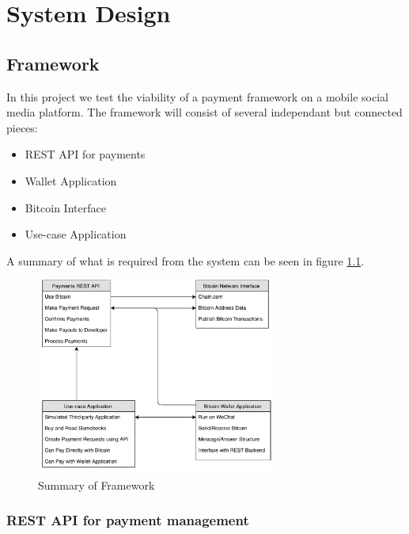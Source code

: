 \chapter{System Design}
\label{chp:System Design}


\section{Framework}

In this project we test the viability of a payment framework on a mobile social media platform. The framework will consist of several independant but connected pieces:

\begin{itemize}
	\item REST API for payments
	\item Wallet Application
	\item Bitcoin Interface
	\item Use-case Application
\end{itemize}

A summary of what is required from the system can be seen in figure \ref{fig:summary_framework}.

\begin{figure}
  \centering
    \includegraphics[width=0.7\textwidth]{figs/Summary.pdf}
   \caption{Summary of Framework} 
   \label{fig:summary_framework}
\end{figure}

\subsection{REST API for payment management}

